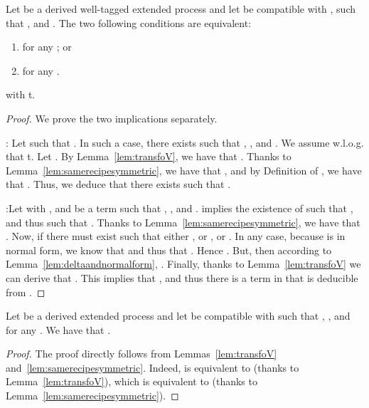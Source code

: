 \begin{corollary}
\label{cor:deltaandkeyhidden}
Let  be a derived well-tagged extended
process and let  be compatible with , such that , and
.  The two following
conditions are equivalent:
\begin{enumerate}
\item   for any ; or
\item   for any {.} 
\end{enumerate}
with 
t. 
\end{corollary}

\smallskip{}

\begin{proof}
We prove the two implications separately.

\noindent : Let  such that . In such a case, there exists  such that
, , and
. We assume w.l.o.g. that t. Let . 
By Lemma~\ref{lem:transfoV}, we
have that {.}
Thanks to Lemma~\ref{lem:samerecipesymmetric}, we have that
{}, and by
Definition of {}, we have that
{}. Thus, we deduce that there
exists {} such that .

\smallskip{}

\noindent :{Let  with }, and  be a term such that , , and . { implies the existence of  such that , and thus such that . Thanks to Lemma~\ref{lem:samerecipesymmetric}, we have that . Now, if  there must exist  such that either , or , or . In any case, because  is in normal form, we know that  and thus that . Hence . But, then according to Lemma~\ref{lem:deltaandnormalform}, . Finally, thanks to Lemma~\ref{lem:transfoV} we can derive that .} This implies that , and thus there is a term in  that is deducible from .
\end{proof}



\begin{corollary}
\label{cor:framestatequiv}
Let  be a derived extended process and let  be compatible with 
such
that , 
 , 
and
 for 
any .
We have that
.
\end{corollary}

\begin{proof}
 The proof directly follows from Lemmas~\ref{lem:transfoV}
 and~\ref{lem:samerecipesymmetric}. 
Indeed,  is
 equivalent to  (thanks to Lemma~\ref{lem:transfoV}), which
 is equivalent to  (thanks to Lemma~\ref{lem:samerecipesymmetric}).
\end{proof}

